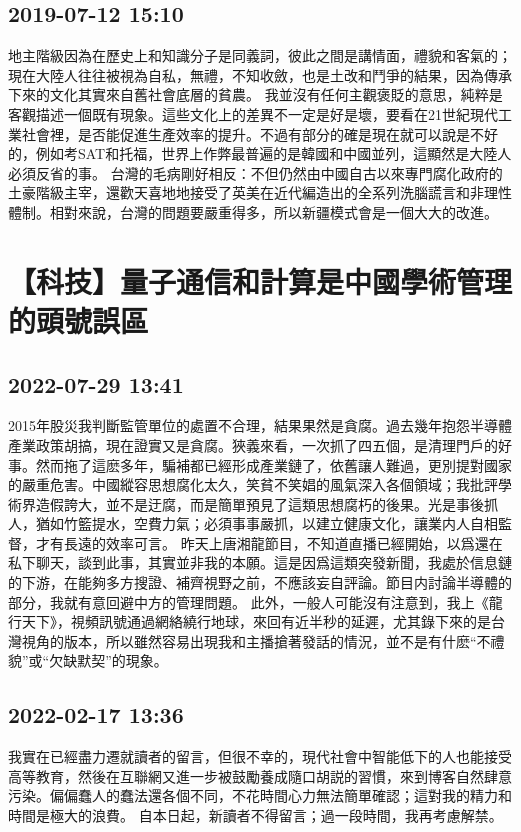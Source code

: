 \documentclass[twocolumn]{ctexart}
\begin{document}
\subsection*{2019-07-12 15:10}

地主階級因為在歷史上和知識分子是同義詞，彼此之間是講情面，禮貌和客氣的；現在大陸人往往被視為自私，無禮，不知收斂，也是土改和鬥爭的結果，因為傳承下來的文化其實來自舊社會底層的貧農。 
我並沒有任何主觀褒貶的意思，純粹是客觀描述一個既有現象。這些文化上的差異不一定是好是壞，要看在21世紀現代工業社會裡，是否能促進生產效率的提升。不過有部分的確是現在就可以說是不好的，例如考SAT和托福，世界上作弊最普遍的是韓國和中國並列，這顯然是大陸人必須反省的事。 
台灣的毛病剛好相反：不但仍然由中國自古以來專門腐化政府的土豪階級主宰，還歡天喜地地接受了英美在近代編造出的全系列洗腦謊言和非理性體制。相對來說，台灣的問題要嚴重得多，所以新疆模式會是一個大大的改進。
\section*{【科技】量子通信和計算是中國學術管理的頭號誤區}
\subsection*{2022-07-29 13:41}

2015年股災我判斷監管單位的處置不合理，結果果然是貪腐。過去幾年抱怨半導體產業政策胡搞，現在證實又是貪腐。狹義來看，一次抓了四五個，是清理門戶的好事。然而拖了這麽多年，騙補都已經形成產業鏈了，依舊讓人難過，更別提對國家的嚴重危害。中國縱容思想腐化太久，笑貧不笑娼的風氣深入各個領域；我批評學術界造假誇大，並不是迂腐，而是簡單預見了這類思想腐朽的後果。光是事後抓人，猶如竹籃提水，空費力氣；必須事事嚴抓，以建立健康文化，讓業内人自相監督，才有長遠的效率可言。
昨天上唐湘龍節目，不知道直播已經開始，以爲還在私下聊天，談到此事，其實並非我的本願。這是因爲這類突發新聞，我處於信息鏈的下游，在能夠多方搜證、補齊視野之前，不應該妄自評論。節目内討論半導體的部分，我就有意回避中方的管理問題。
此外，一般人可能沒有注意到，我上《龍行天下》，視頻訊號通過網絡繞行地球，來回有近半秒的延遲，尤其錄下來的是台灣視角的版本，所以雖然容易出現我和主播搶著發話的情況，並不是有什麽“不禮貌”或“欠缺默契”的現象。
\subsection*{2022-02-17 13:36}

我實在已經盡力遷就讀者的留言，但很不幸的，現代社會中智能低下的人也能接受高等教育，然後在互聯網又進一步被鼓勵養成隨口胡説的習慣，來到博客自然肆意污染。偏偏蠢人的蠢法還各個不同，不花時間心力無法簡單確認；這對我的精力和時間是極大的浪費。
自本日起，新讀者不得留言；過一段時間，我再考慮解禁。
\end{document}
